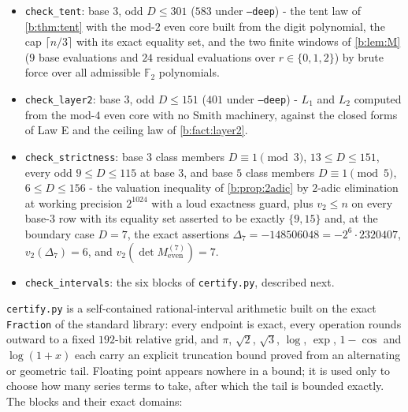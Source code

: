 \documentclass[11pt]{amsart}
\theoremstyle{definition}
\theoremstyle{remark}
\begin{document}
\begin{itemize}
\item \texttt{check\_tent}: base $3$, odd $D \le 301$ ($583$ under \texttt{--deep}) - the tent law of \cref{b:thm:tent} with the mod-$2$ even core built from the digit polynomial, the cap $\lceil n/3 \rceil$ with its exact equality set, and the two finite windows of \cref{b:lem:M} ($9$ base evaluations and $24$ residual evaluations over $r \in \{0,1,2\}$) by brute force over all admissible $\mathbb{F}_2$ polynomials.
\item \texttt{check\_layer2}: base $3$, odd $D \le 151$ ($401$ under \texttt{--deep}) - $L_1$ and $L_2$ computed from the mod-$4$ even core with no Smith machinery, against the closed forms of Law E and the ceiling law of \cref{b:fact:layer2}.
\item \texttt{check\_strictness}: base $3$ class members $D \equiv 1 \pmod 3$, $13 \le D \le 151$, every odd $9 \le D \le 115$ at base $3$, and base $5$ class members $D \equiv 1 \pmod 5$, $6 \le D \le 156$ - the valuation inequality of \cref{b:prop:2adic} by $2$-adic elimination at working precision $2^{1024}$ with a loud exactness guard, plus $v_2 \le n$ on every base-$3$ row with its equality set asserted to be exactly $\{9, 15\}$ and, at the boundary case $D = 7$, the exact assertions $\Delta_7 = -148506048 = -2^6 \cdot 2320407$, $v_2(\Delta_7) = 6$, and $v_2(\det M_{\mathrm{even}}^{(7)}) = 7$.
\item \texttt{check\_intervals}: the six blocks of \texttt{certify.py}, described next.
\end{itemize}

\texttt{certify.py} is a self-contained rational-interval arithmetic built on the exact \texttt{Fraction} of the standard library: every endpoint is exact, every operation rounds outward to a fixed $192$-bit relative grid, and $\pi$, $\sqrt2$, $\sqrt3$, $\log$, $\exp$, $1-\cos$ and $\log(1+x)$ each carry an explicit truncation bound proved from an alternating or geometric tail. Floating point appears nowhere in a bound; it is used only to choose how many series terms to take, after which the tail is bounded exactly. The blocks and their exact domains:
\end{document}
